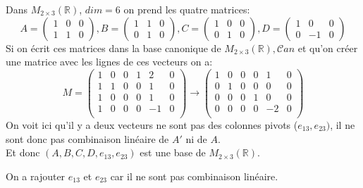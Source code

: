\begin{exemple}
Dans $M_{2 \times 3}(\mathbb{R})$, $dim = 6$ on prend les quatre matrices:
\[A = \begin{pmatrix}
    1 & 0 & 0 \\ 1 & 1 & 0
\end{pmatrix} ,  B = \begin{pmatrix}
    1 & 1 & 0 \\ 0 & 1 & 0
\end{pmatrix}, C  = \begin{pmatrix}
    1 & 0 & 0 \\ 0 & 1 & 0
\end{pmatrix}, D = \begin{pmatrix}
    1 & 0 & 0 \\ 0 & -1 & 0
\end{pmatrix}\]
Si on écrit ces matrices dans la base canonique de $M_{2\times 3}(\mathbb{R}), \mathcal{C}an$ et qu'on créer une matrice avec les lignes de ces vecteurs on a:
\[M = \begin{pmatrix}
    1 & 0 & 0 & 1 & 2 & 0\\
    1 & 1 & 0 & 0 & 1 & 0\\
    1 & 0 & 0 & 0 & 1 & 0 \\
    1 & 0 & 0 & 0 & - 1 & 0 \\
\end{pmatrix} \to \begin{pmatrix}
    1 & 0 & 0 & 0 & 1 & 0\\
    0 & 1 & 0 & 0 & 0 & 0\\
    0 & 0 & 0 & 1 & 0 & 0 \\
    0 & 0 & 0 & 0 & - 2 & 0 \\
\end{pmatrix} \]
On voit ici qu'il y a deux vecteurs ne sont pas des colonnes pivots ($e_{13}, e_{23})$, il ne sont donc pas combinaison linéaire de $A'$ ni de $A$.
\\
Et donc $(A, B, C, D, e_{13}, e_{23})$ est une base de $M_{2\times 3}(\mathbb{R})$.
\begin{framedremark}
    On a rajouter $e_{13}$ et $e_{23}$ car il ne sont pas combinaison linéaire.
\end{framedremark}
\end{exemple}

